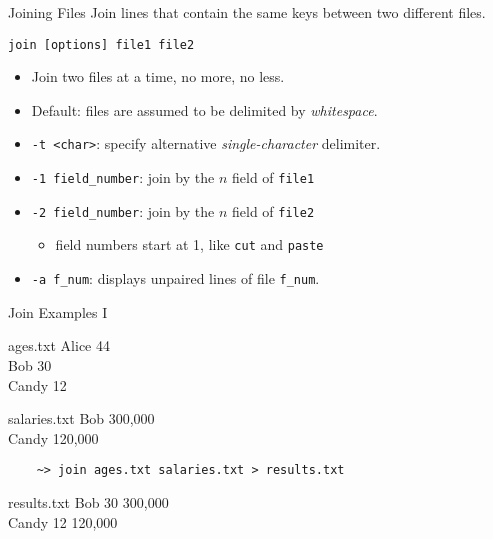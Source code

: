 \begin{frame}[fragile]{Joining Files}
  Join lines that contain the same keys between two different files.

  \begin{block}{}
    \texttt{join [options] file1 file2}
    \begin{itemize}
      \item Join two files at a time, no more, no less.
      \item Default: files are assumed to be delimited by \emph{whitespace}.
      \item \texttt{-t <char>}: specify alternative \emph{single-character} delimiter.
      \item \texttt{-1 field\_number}: join by the $n$ field of \texttt{file1}
      \item \texttt{-2 field\_number}: join by the $n$ field of \texttt{file2}
      \begin{itemize}
        \item field numbers start at 1, like \texttt{cut} and \texttt{paste}
      \end{itemize}
      \item \texttt{-a f\_num}: displays unpaired lines of file \texttt{f\_num}.
    \end{itemize}
  \end{block}
\end{frame}

\begin{frame}[fragile]{Join Examples I}
  \begin{block}{ages.txt}
    {\footnotesize\ttfamily
      Alice 44\\
      Bob 30\\
      Candy 12\\
    }
  \end{block}
  \begin{block}{salaries.txt}
    {\footnotesize\ttfamily
      Bob 300,000\\
      Candy 120,000\\
    }
  \end{block}
  \begin{verbatim}
    ~> join ages.txt salaries.txt > results.txt
  \end{verbatim}
  \begin{block}{results.txt}
    {\footnotesize\ttfamily
      Bob 30 300,000\\
      Candy 12 120,000\\
    }
  \end{block}
\end{frame}


